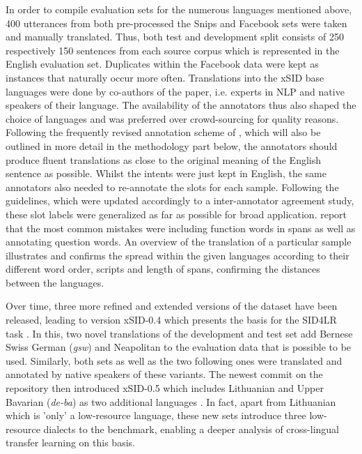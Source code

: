 \documentclass[11pt,a4paper,twoside,openright]{scrbook}
\begin{document}
In order to compile evaluation sets for the numerous languages mentioned above, 400 utterances from both pre-processed the Snips and Facebook sets were taken and manually translated. Thus, both test and development split consists of 250 respectively 150 sentences from each source corpus which is represented in the English evaluation set. Duplicates within the Facebook data were kept as instances that naturally occur more often. Translations into the xSID base languages were done by co-authors of the paper, i.e. experts in NLP and native speakers of their language. The availability of the annotators thus also shaped the choice of languages and was preferred over crowd-sourcing for quality reasons. Following the frequently revised annotation scheme of \citet{van-der-goot-etal-2021-masked}, which will also be outlined in more detail in the methodology part below, the annotators should produce fluent translations as close to the original meaning of the English sentence as possible. Whilst the intents were just kept in English, the same annotators also needed to re-annotate the slots for each sample. Following the guidelines, which were updated accordingly to a inter-annotator agreement study, these slot labels were generalized as far as possible for broad application. \citet{van-der-goot-etal-2021-masked} report that the most common mistakes were including function words in spans as well as annotating question words. An overview of the translation of a particular sample illustrates and confirms the spread within the given languages according to their different word order, scripts and length of spans, confirming the distances between the languages.

Over time, three more refined and extended versions of the dataset have been released, leading to version xSID-0.4 which presents the basis for the SID4LR task \citep{2023-findings-vardial}. In this, two novel translations of the development and test set add Bernese Swiss German (\textit{gsw}) and Neapolitan to the evaluation data that is possible to be used. Similarly, both sets as well as the two following ones were translated and annotated by native speakers of these variants. The newest commit on the \citet{van-der-goot-etal-2021-masked} repository then introduced xSID-0.5 which includes Lithuanian and Upper Bavarian (\textit{de-ba}) as two additional languages \citep{winkler-etal-2024-slot-intent}. In fact, apart from Lithuanian which is 'only' a low-resource language, these new sets introduce three low-resource dialects to the benchmark, enabling a deeper analysis of cross-lingual transfer learning on this basis. 
\end{document}
